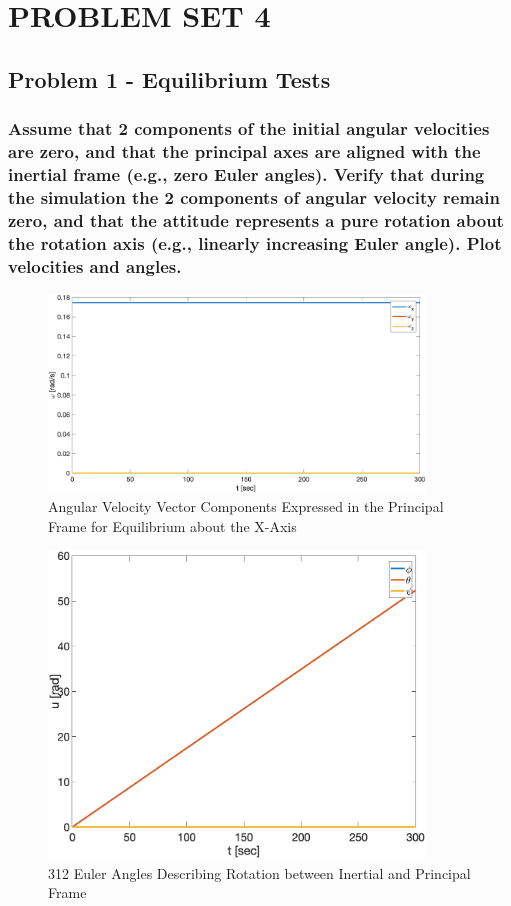 \section{\Large PROBLEM SET 4}

\subsection{Problem 1 - Equilibrium Tests}

\subsubsection{Assume that 2 components of the initial angular velocities are zero, and that the principal axes are
aligned with the inertial frame (e.g., zero Euler angles). Verify that during the simulation the 2
components of angular velocity remain zero, and that the attitude represents a pure rotation about
the rotation axis (e.g., linearly increasing Euler angle). Plot velocities and angles.}

\begin{figure}[H]
    \centering
    \captionsetup{justification = centering}
    \includegraphics[width = 10cm]{Images/PS4/equilibrium_inertial_velocities.png}
    \caption{Angular Velocity Vector Components Expressed in the Principal Frame for Equilibrium about the X-Axis}
    \label{fig:inertial_equilibrium_velocities}
\end{figure}

\begin{figure}[H]
    \centering
    \captionsetup{justification = centering}
    \includegraphics[width = 10cm]{Images/PS4/equilibrium_inertial_angles.png}
    \caption{312 Euler Angles Describing Rotation between Inertial and Principal Frame}
    \label{fig:inertial_equilibrium_angles}
\end{figure}

